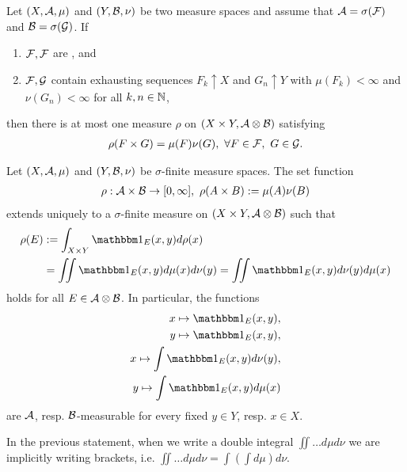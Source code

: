 \begin{thm}
	\label{thm:uniqueness-product-measure}
	Let $(X, \mathcal{A}, \mu)$ and $(Y, \mathcal{B}, \nu)$ be two measure spaces and assume that $\mathcal{A} = \sigma(\mathcal{F})$ and $\mathcal{B} = \sigma(\mathcal{G})$. If
	\begin{enumerate}
		\item $\mathcal{F}, \mathcal{F}$ are \istable, and
		\item $\mathcal{F}, \mathcal{G}$ contain exhausting sequences $F_k \uparrow X$ and $G_n \uparrow Y$ with $\mu(F_k) < \infty$ and $\nu(G_n) < \infty$ for all $k, n \in \mathbb{N}$,
	\end{enumerate}
	then there is at most one measure $\rho$ on $(X \times Y, \mathcal{A} \otimes \mathcal{B})$ satisfying
	\begin{align*}
		\rho(F \times G) = \mu(F) \nu(G),\ \forall F \in \mathcal{F},\ G \in \mathcal{G}.
	\end{align*}
\end{thm}

\begin{thm}
	\label{thm:existence-product-measure}
	Let $(X, \mathcal{A}, \mu)$ and $(Y, \mathcal{B}, \nu)$ be $\sigma$-finite measure spaces. The set function
	\begin{align*}
		\rho : \mathcal{A} \times \mathcal{B} \to [0,\infty],\ \rho(A \times B) := \mu(A)\nu(B)
	\end{align*}
	extends uniquely to a $\sigma$-finite measure on $(X \times Y, \mathcal{A} \otimes \mathcal{B})$ such that
	\begin{align}
		\rho(E) 
		&:= \int_{X\times Y} \ind_E(x, y) d\rho(x) \\
		\label{eq:product-existence-5}
		&= \iint \ind_E(x, y) d\mu(x) d\nu(y) = \iint \ind_E(x, y) d\nu(y)d\mu(x)
	\end{align}
	holds for all $E \in \mathcal{A} \otimes \mathcal{B}$. In particular, the functions
	\begin{align}
		\label{eq:product-existence-1}
		x \mapsto \ind_E(x, y),\\
		\label{eq:product-existence-2}
		y \mapsto \ind_E(x, y),\\
		\label{eq:product-existence-3}
		x \mapsto \int \ind_E(x, y) d\nu(y),\\
		\label{eq:product-existence-4}
		y \mapsto \int \ind_E(x, y) d\mu(x)
	\end{align}
	are $\mathcal{A}$, resp. $\mathcal{B}$-measurable for every fixed $y \in Y$, resp. $x \in X$.
\end{thm}

In the previous statement, when we write a double integral $\iint \dots d\mu d\nu$ we are implicitly writing brackets, i.e. $\iint \dots d\mu d\nu = \int (\int d\mu) d\nu$.

